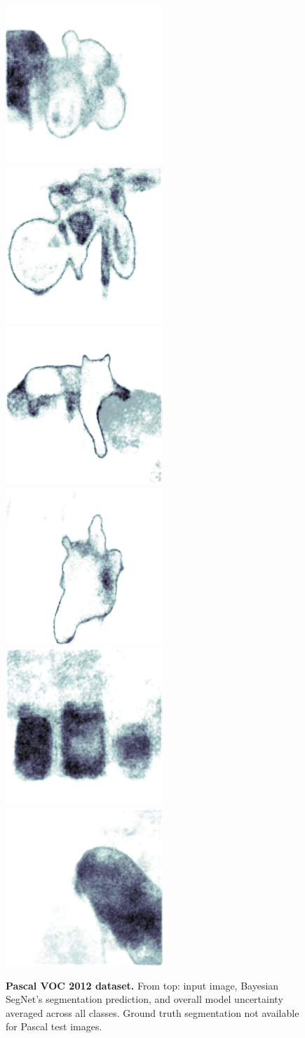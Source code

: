 \begin{figure}[p]
\begin{center}
{\includegraphics[height=0.125\linewidth]{BayesianSegNet/segnet_bayes_00202_uncertainty.png}
\includegraphics[height=0.125\linewidth]{BayesianSegNet/segnet_bayes_00147_uncertainty.png}
\includegraphics[height=0.125\linewidth]{BayesianSegNet/segnet_bayes_00148_uncertainty.png}
\includegraphics[height=0.125\linewidth]{BayesianSegNet/segnet_bayes_00166_uncertainty.png}
\includegraphics[height=0.125\linewidth]{BayesianSegNet/segnet_bayes_00017_uncertainty.png}
\includegraphics[height=0.125\linewidth]{BayesianSegNet/segnet_bayes_00023_uncertainty.png}
}
\end{center}
\caption[Bayesian SegNet results on the Pascal VOC dataset.]{\footnotesize \textbf{Pascal VOC 2012 dataset.} From top: input image, Bayesian SegNet's segmentation prediction, and overall model uncertainty averaged across all classes. Ground truth segmentation not available for Pascal test images.}
\label{fig:qual_pascal}
\end{figure}


